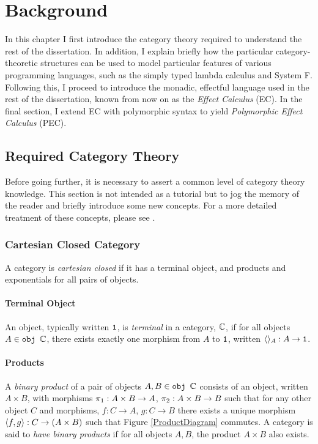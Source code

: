 
\chapter{Background}



In this chapter I first introduce the  category theory required to understand the rest of the dissertation. In addition, I explain briefly how the particular category-theoretic structures can be used to model particular features of various programming languages, such as the simply typed lambda calculus and System F. Following this, I proceed to introduce the monadic, effectful language used in the rest of the dissertation, known from now on as the \textit{Effect Calculus} (EC). In the final section, I extend EC with polymorphic syntax to yield \textit{Polymorphic Effect Calculus} (PEC).

\section{Required Category Theory}\label{CategoryTheoryRequirements}


Before going further, it is necessary to assert a common level of category theory knowledge. This section is not intended as a tutorial but to jog the memory of the reader and briefly introduce some new concepts. For a more detailed treatment of these concepts, please see \cite{maclane:71}.

\subsection{Cartesian Closed Category}\label{CCC}
A category is \textit{cartesian closed} if it has a terminal object, and products and exponentials for all pairs of objects.

\subsubsection{Terminal Object}
An object, typically written $\texttt{1}$, is \textit{terminal} in a category, $\mathbb{C}$, if for all objects $A\in\texttt{obj }\mathbb{C}$, there exists exactly one morphism from $A$ to $\texttt{1}$, written $\langle\rangle_{A}: A \rightarrow \texttt{1}$.

\subsubsection{Products}
A \textit{binary product} of a pair of objects $A, B\in\texttt{obj }\mathbb{C}$ consists of an object, written $A \times B$, with morphisms $\pi_1: A\times B\rightarrow A$, $\pi_2: A\times B \rightarrow B$ such that for any other object $C$ and morphisms, $f: C\rightarrow A$, $g: C\rightarrow B$ there exists a unique morphism $\langle f, g\rangle: C \rightarrow (A\times B)$ such that Figure \ref{ProductDiagram} commutes.
A category is said to \textit{have binary products} if for all objects $A, B$, the product $A\times B$ also exists.

